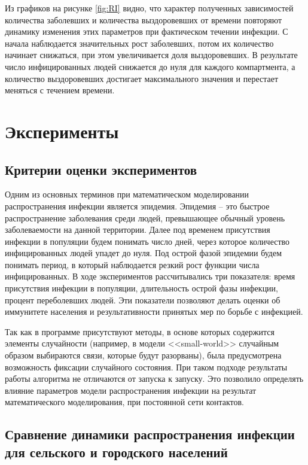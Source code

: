 \documentclass[14pt,a4paper]{article}
\begin{document}
Из графиков на рисунке \ref{fig:RI} видно, что характер полученных зависимостей количества заболевших и количества выздоровевших от времени повторяют динамику изменения этих параметров при фактическом течении инфекции. С начала наблюдается значительных рост заболевших, потом их количество начинает снижаться, при этом увеличивается доля выздоровевших.  В результате число инфицированных людей снижается до нуля для каждого компартмента, а количество выздоровевших достигает максимального значения и перестает меняться с течением времени. 

\newpage

\section{Эксперименты}
\subsection{Критерии оценки экспериментов}
Одним из основных терминов при математическом моделировании распространения инфекции является эпидемия. Эпидемия -- это быстрое распространение заболевания среди людей, превышающее обычный уровень заболеваемости на данной территории. Далее под временем присутствия инфекции в популяции будем понимать число дней, через которое количество инфицированных людей упадет до нуля. Под острой фазой эпидемии будем понимать период, в который наблюдается резкий рост функции числа инфицированных. В ходе экспериментов рассчитывались три показателя: время присутствия инфекции в популяции, длительность острой фазы инфекции, процент переболевших людей. Эти показатели позволяют делать оценки об иммунитете населения и результативности принятых мер по борьбе с инфекцией.

Так как в программе присутствуют методы, в основе которых содержится элементы случайности (например, в модели <<small-world>> случайным образом выбираются связи, которые будут разорваны), была предусмотрена возможность фиксации случайного состояния. При  таком подходе результаты работы алгоритма не отличаются от запуска к запуску. Это позволило определять
влияние параметров модели распространения инфекции на результат математического моделирования, при постоянной сети контактов.

\subsection{Сравнение динамики распространения инфекции для сельского и городского населений}
\end{document}
